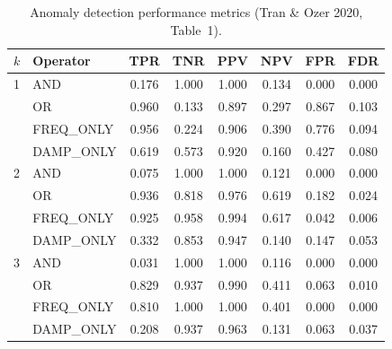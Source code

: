 \begin{table}[htbp]
\centering
\small
\caption{Anomaly detection performance metrics (Tran \& Ozer 2020, Table~1).}
\label{tab:detection}
\begin{tabular}{llcccccc}
\toprule
$k$ & Operator & TPR & TNR & PPV & NPV & FPR & FDR \\
\midrule
1 & AND & 0.176 & 1.000 & 1.000 & 0.134 & 0.000 & 0.000 \\
 & OR & 0.960 & 0.133 & 0.897 & 0.297 & 0.867 & 0.103 \\
 & FREQ_ONLY & 0.956 & 0.224 & 0.906 & 0.390 & 0.776 & 0.094 \\
 & DAMP_ONLY & 0.619 & 0.573 & 0.920 & 0.160 & 0.427 & 0.080 \\
\midrule
2 & AND & 0.075 & 1.000 & 1.000 & 0.121 & 0.000 & 0.000 \\
 & OR & 0.936 & 0.818 & 0.976 & 0.619 & 0.182 & 0.024 \\
 & FREQ_ONLY & 0.925 & 0.958 & 0.994 & 0.617 & 0.042 & 0.006 \\
 & DAMP_ONLY & 0.332 & 0.853 & 0.947 & 0.140 & 0.147 & 0.053 \\
\midrule
3 & AND & 0.031 & 1.000 & 1.000 & 0.116 & 0.000 & 0.000 \\
 & OR & 0.829 & 0.937 & 0.990 & 0.411 & 0.063 & 0.010 \\
 & FREQ_ONLY & 0.810 & 1.000 & 1.000 & 0.401 & 0.000 & 0.000 \\
 & DAMP_ONLY & 0.208 & 0.937 & 0.963 & 0.131 & 0.063 & 0.037 \\
\midrule
\bottomrule
\end{tabular}
\end{table}